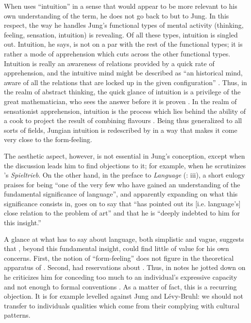 \documentclass[output=paper]{langscibook}
\begin{document}
When {\Sapir} uses ``intuition'' in a sense that would appear to be more relevant to his own understanding of the term, he does not go back to {\Croce} but to Jung. In this respect, the way he handles Jung's functional types of mental activity (thinking, feeling, sensation, intuition) is revealing. Of all these types, intuition is singled out. Intuition, he says, is not on a par with the rest of the functional types; it is rather a mode of apprehension which cuts across the other functional types. Intuition is really an awareness of relations provided by a quick rate of apprehension, and the intuitive mind might be described as ``an historical mind, aware of all the relations that are locked up in the given configuration'' \citep[167]{Sapir2002}. Thus, in the realm of abstract thinking, the quick glance of intuition is a privilege of the great mathematician, who sees the answer before it is proven \citep[167]{Sapir2002}. In the realm of sensationist apprehension, intuition is the process which lies behind the ability of a cook to project the result of combining flavours \citep[168]{Sapir2002}. Being thus generalized to all sorts of fields, Jungian intuition is redescribed by {\Sapir} in a way that makes it come very close to the form-feeling.

The aesthetic aspect, however, is not essential in Jung's conception, except when the discussion leads him to find objections to it; for example, when he scrutinizes {\Schiller}'s \emph{Spieltrieb}. On the other hand, in the preface to \emph{Language} (\citeyear{Sapir1921}: iii), a short eulogy praises {\Croce} for being ``one of the very few who have gained an understanding of the fundamental significance of language'', and apparently expanding on what this significance consists in, {\Sapir} goes on to say that {\Croce} ``has pointed out its [i.e. language's] close relation to the problem of art'' and that he is ``deeply indebted to him for this insight.''

A glance at what {\Croce} has to say about language, both simplistic and vague, suggests that {\Sapir}, beyond this fundamental insight, could find little of value for his own concerns. First, the notion of ``form-feeling'' does not figure in the theoretical apparatus of {\Croce}. Second, {\Sapir} had reservations about {\Croce}. Thus, in notes he jotted down on {\Croce} he criticizes him for conceding too much to an individual's expressive capacity and not enough to formal conventions \citep{Handler1986}. As a matter of fact, this is a recurring objection. It is for example levelled against Jung and Lévy-Bruhl: we should not transfer to individuals qualities which come from their complying with cultural patterns.
\end{document}
